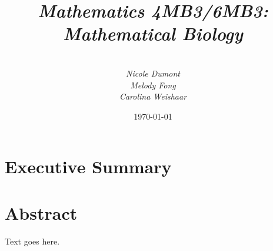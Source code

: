 \documentclass[twocolumn,nofootinbib,showkeys,twoside,floatfix,unsortedaddress,flushbottom,10pt,aps,pra]{report}
\author{\sc{\bfseries Model Students:}\\
\small \emph{Nicole Dumont} \\
 \small \emph{Melody Fong} \\
 \small  \emph{Carolina Weishaar}}
\title{ \small \emph{Mathematics 4MB3/6MB3: Mathematical Biology }\\
  \Huge \sc{\bfseries Spatial Epidemics Dynamics:\\ Synchronization}}
\date{\today}
\begin{document}
\pagestyle{fancy}

\maketitle
\tableofcontents

\onecolumn
\section*{\Huge Executive Summary}
%
\lipsum[34]

\twocolumn

\section{Abstract} Text goes here.
\end{document}
